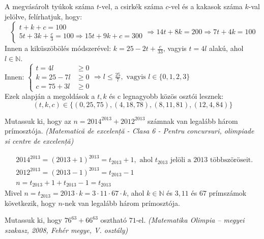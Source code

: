 \begin{solution}
A megvásárolt tyúkok száma $t$-vel, a csirkék száma $c$-vel és a
kakasok száma $k$-val jelölve, felírhatjuk, hogy: 
\[
\left\{ \begin{array}{ll}
t+k+c=100\\
5t+3k+{\displaystyle {\frac{c}{3}}=100\Rightarrow15t+9k+c=300}
\end{array}\right.\Rightarrow14t+8k=200\Rightarrow7t+4k=100
\]
Innen a kiküszöbölés módszerével: $k=25-2t+{\displaystyle {\frac{c}{33}}}$,
vagyis $t=4l$ alakú, ahol $l\in\mathbb{N}$. \\
Innen: $\left\{ \begin{array}{ll}
t=4l & \geq0\\
k=25-7l & \geq0\\
c=75+3l & \geq0
\end{array}\right.\Rightarrow l\leq{\displaystyle {\frac{25}{7}},\text{ vagyis }l\in\{0,1,2,3\}}$ \\
Ezek alapján a megoldások a $t,k$ és c legnagyobb közös osztói lesznek:
\[
(t,k,c)\in\{(0,25,75),(4,18,78),(8,11,81),(12,4,84)\}
\]
\end{solution}
\begin{extraproblem}
Mutassuk ki, hogy az $n=2014^{2013}+2012^{2013}$ számnak van legalább
három prímosztója. \emph{(Matematică de excelență - Clasa 6 -
Pentru concursuri, olimpiade si centre de excelență) }
\end{extraproblem}

\begin{solution}
\begin{align*}
 & 2014^{2013}=(2013+1)^{2013}=t_{2013}+1,\text{ ahol }t_{2013}\text{ jelöli a }2013\mbox{ többszöröseit. }\\
 & 2012^{2013}=(2013-1)^{2013}=t_{2013}-1\\
 & n=t_{2013}+1+t_{2013}-1=t_{2013}
\end{align*}
Mivel $n=t_{2013}=2013\cdot k=3\cdot11\cdot67\cdot k$, ahol $k\in\mathbb{N}$
és $3,11$ és $67$ prímszámok következik, hogy $n$-nek van legalább
három prímosztója. 
\end{solution}
\begin{extraproblem}
Mutassuk ki, hogy $76^{63}+66^{63}$ osztható $71$-el. \emph{ (Matematika
Olimpia -- megyei szakasz, 2008, Fehér megye, V. osztály) }
\end{extraproblem}

